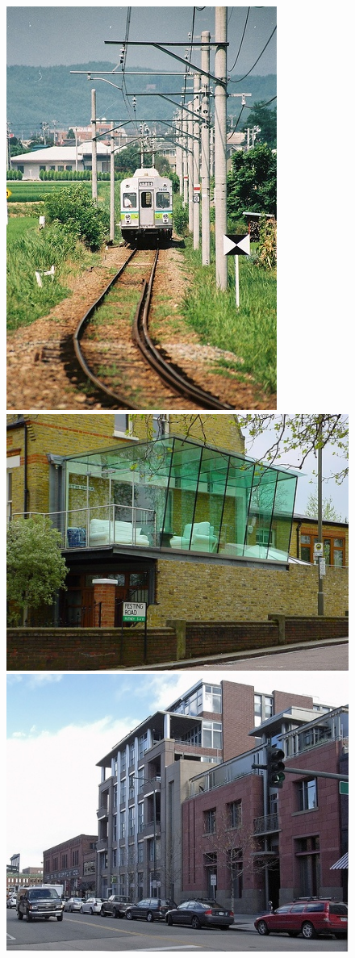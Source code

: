 \documentclass[a4paper]{article}
\begin{document}
\begin{figure}[h]
	\center
	\begin{multicols}{4}
		\includegraphics[width=0.7\linewidth]{fig/unnormalize/000002}
		\includegraphics[width=0.8\linewidth]{fig/unnormalize/000003}
		\includegraphics[width=0.8\linewidth]{fig/unnormalize/000004}

\end{multicols}
\end{figure}
\end{document}
